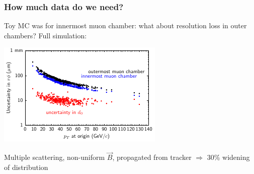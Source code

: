 \documentclass[compress]{beamer}
\begin{document}
\begin{frame}
\frametitle{How much data do we need?}

Toy MC was for innermost muon chamber: what about resolution loss in
outer chambers?  Full simulation:

\begin{center}
\includegraphics[width=0.7\linewidth]{degradation_of_residuals3}
\end{center}

\vspace{-0.3 cm}
Multiple scattering, non-uniform $\vec{B}$, propagated from tracker
$\Rightarrow$ 30\% widening of distribution
\end{frame}
\end{document}
